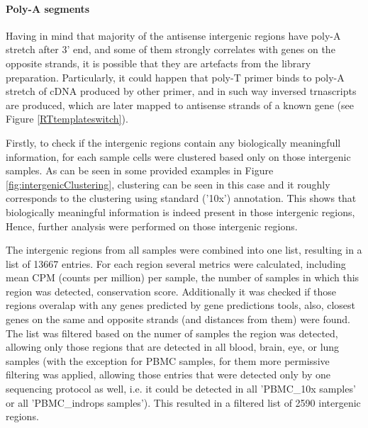 \paragraph{Poly-A segments}

Having in mind that majority of the antisense intergenic regions have poly-A stretch after 3' end,
and some of them strongly correlates with genes on the opposite strands,
it is possible that they are artefacts from the library preparation.
Particularly, it could happen that poly-T primer binds to poly-A stretch of cDNA produced by other primer,
and in such way inversed trnascripts are produced,
which are later mapped to antisense strands of a known gene (see Figure \ref{RTtemplateswitch}).











\iffalse

Firstly, to check if the intergenic regions contain any biologically meaningfull information,
for each sample cells were clustered based only on those intergenic samples.
As can be seen in some provided examples in Figure \ref{fig:intergenicClustering},
clustering can be seen in this case and it roughly corresponds to the clustering using standard ('10x') annotation.
This shows that biologically meaningful information is indeed present in those intergenic regions,
Hence, further analysis were performed on those intergenic regions.

The intergenic regions from all samples were combined into one list, resulting in a list of 13667 entries.
For each region several metrics were calculated, including mean CPM (counts per million) per sample,
the number of samples in which this region was detected, conservation score.
Additionally it was checked if those regions overalap with any genes predicted by gene predictions tools,
also, closest genes on the same and opposite strands (and distances from them) were found.
The list was filtered based on the numer of samples the region was detected, allowing only those regions that are detected in all
blood, brain, eye, or lung samples (with the exception for PBMC samples,
for them more permissive filtering was applied, allowing those entries that were detected only by one sequencing protocol as well,
i.e. it could be detected in all 'PBMC\_10x samples' or all 'PBMC\_indrops samples').
This resulted in a filtered list of 2590 intergenic regions.

